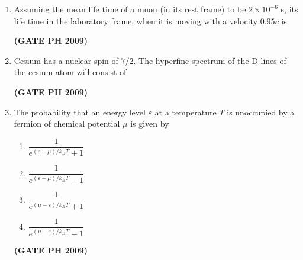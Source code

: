 \documentclass[14pt, a4paper]{extarticle}
\begin{document}
\begin{enumerate}[label=\textbf{Q. \arabic*}, start=21]
\item Assuming the mean life time of a muon (in its rest frame) to be $2\times10^{-6}$ s, its life time in the laboratory frame, when it is moving with a velocity $0.95c$ is
    \begin{enumerate}
    \end{enumerate}
    \hfill \textbf{(GATE PH 2009)}


\item Cesium has a nuclear spin of $7/2$. The hyperfine spectrum of the D lines of the cesium atom will consist of
\begin{enumerate}
\end{enumerate}
\hfill \textbf{(GATE PH 2009)}

\item The probability that an energy level $\varepsilon$ at a temperature $T$ is unoccupied by a fermion of chemical potential $\mu$ is given by
\begin{enumerate}
\item $\dfrac{1}{e^{(\varepsilon-\mu)/k_B T} + 1}$
\item $\dfrac{1}{e^{(\varepsilon-\mu)/k_B T} - 1}$
\item $\dfrac{1}{e^{(\mu-\varepsilon)/k_B T} + 1}$
\item $\dfrac{1}{e^{(\mu-\varepsilon)/k_B T} - 1}$
\end{enumerate}
\hfill \textbf{(GATE PH 2009)}


\end{enumerate}
\end{document}
